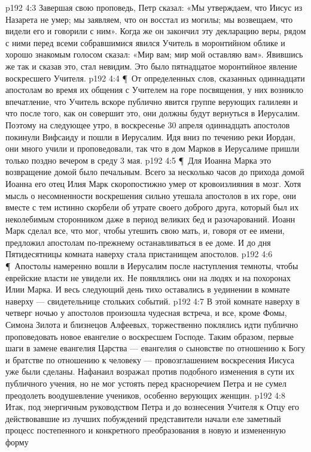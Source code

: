 \vs p192 4:3 Завершая свою проповедь, Петр сказал: «Мы утверждаем, что Иисус из Назарета не умер; мы заявляем, что он восстал из могилы; мы возвещаем, что видели его и говорили с ним». Когда же он закончил эту декларацию веры, рядом с ними перед всеми собравшимися явился Учитель в моронтийном облике и хорошо знакомым голосом сказал: «Мир вам; мир мой оставляю вам». Явившись же так и сказав это, стал невидим. Это было пятнадцатое моронтийное явление воскресшего Учителя.
\vs p192 4:4 \P\ От определенных слов, сказанных одиннадцати апостолам во время их общения с Учителем на горе посвящения, у них возникло впечатление, что Учитель вскоре публично явится группе верующих галилеян и что после того, как он совершит это, они должны будут вернуться в Иерусалим. Поэтому на следующее утро, в воскресенье 30 апреля одиннадцать апостолов покинули Вифсаиду и пошли в Иерусалим. Идя вниз по течению реки Иордан, они много учили и проповедовали, так что в дом Марков в Иерусалиме пришли только поздно вечером в среду 3 мая.
\vs p192 4:5 \P\ Для Иоанна Марка это возвращение домой было печальным. Всего за несколько часов до прихода домой Иоанна его отец Илия Марк скоропостижно умер от кровоизлияния в мозг. Хотя мысль о несомненности воскрешения сильно утешала апостолов в их горе, они вместе с тем истинно скорбели об утрате своего доброго друга, который был их неколебимым сторонником даже в период великих бед и разочарований. Иоанн Марк сделал все, что мог, чтобы утешить свою мать, и, говоря от ее имени, предложил апостолам по\hyp{}прежнему останавливаться в ее доме. И до дня Пятидесятницы комната наверху стала пристанищем апостолов.
\vs p192 4:6 \P\ Апостолы намеренно вошли в Иерусалим после наступления темноты, чтобы еврейские власти не увидели их. Не появлялись они на людях и на похоронах Илии Марка. И весь следующий день тихо оставались в уединении в комнате наверху --- свидетельнице стольких событий.
\vs p192 4:7 В этой комнате наверху в четверг ночью у апостолов произошла чудесная встреча, и все, кроме Фомы, Симона Зилота и близнецов Алфеевых, торжественно поклялись идти публично проповедовать новое евангелие о воскресшем Господе. Таким образом, первые шаги в замене евангелия Царства --- евангелия о сыновстве по отношению к Богу и братстве по отношению к человеку --- провозглашением воскресения Иисуса уже были сделаны. Нафанаил возражал против подобного изменения в сути их публичного учения, но не мог устоять перед красноречием Петра и не сумел преодолеть воодушевление учеников, особенно верующих женщин.
\vs p192 4:8 Итак, под энергичным руководством Петра и до вознесения Учителя к Отцу его действовавшие из лучших побуждений представители начали еле заметный процесс постепенного и конкретного преобразования  в новую и измененную форму 

